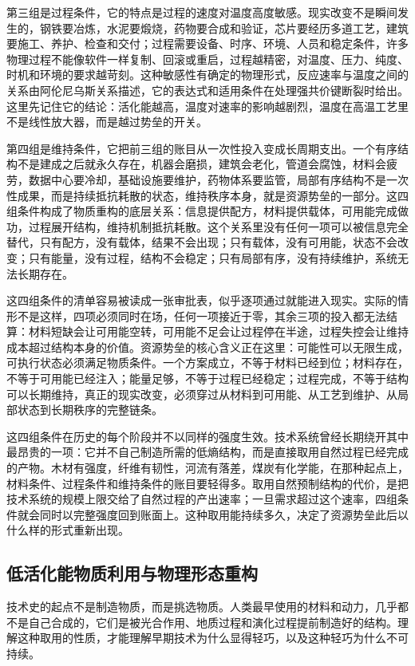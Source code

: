 第三组是过程条件，它的特点是过程的速度对温度高度敏感。现实改变不是瞬间发生的，钢铁要冶炼，水泥要煅烧，药物要合成和验证，芯片要经历多道工艺，建筑要施工、养护、检查和交付；过程需要设备、时序、环境、人员和稳定条件，许多物理过程不能像软件一样复制、回滚或重启，过程越精密，对温度、压力、纯度、时机和环境的要求越苛刻。这种敏感性有确定的物理形式，反应速率与温度之间的关系由阿伦尼乌斯关系描述，它的表达式和适用条件在处理强共价键断裂时给出。这里先记住它的结论：活化能越高，温度对速率的影响越剧烈，温度在高温工艺里不是线性放大器，而是越过势垒的开关。

第四组是维持条件，它把前三组的账目从一次性投入变成长周期支出。一个有序结构不是建成之后就永久存在，机器会磨损，建筑会老化，管道会腐蚀，材料会疲劳，数据中心要冷却，基础设施要维护，药物体系要监管，局部有序结构不是一次性成果，而是持续抵抗耗散的状态，维持秩序本身，就是资源势垒的一部分。这四组条件构成了物质重构的底层关系：信息提供配方，材料提供载体，可用能完成做功，过程展开结构，维持机制抵抗耗散。这个关系里没有任何一项可以被信息完全替代，只有配方，没有载体，结果不会出现；只有载体，没有可用能，状态不会改变；只有能量，没有过程，结构不会稳定；只有局部有序，没有持续维护，系统无法长期存在。

这四组条件的清单容易被读成一张审批表，似乎逐项通过就能进入现实。实际的情形不是这样，四项必须同时在场，任何一项接近于零，其余三项的投入都无法结算：材料短缺会让可用能空转，可用能不足会让过程停在半途，过程失控会让维持成本超过结构本身的价值。资源势垒的核心含义正在这里：可能性可以无限生成，可执行状态必须满足物质条件。一个方案成立，不等于材料已经到位；材料存在，不等于可用能已经注入；能量足够，不等于过程已经稳定；过程完成，不等于结构可以长期维持，真正的现实改变，必须穿过从材料到可用能、从工艺到维护、从局部状态到长期秩序的完整链条。

这四组条件在历史的每个阶段并不以同样的强度生效。技术系统曾经长期绕开其中最昂贵的一项：它并不自己制造所需的低熵结构，而是直接取用自然过程已经完成的产物。木材有强度，纤维有韧性，河流有落差，煤炭有化学能，在那种起点上，材料条件、过程条件和维持条件的账目要轻得多。取用自然预制结构的代价，是把技术系统的规模上限交给了自然过程的产出速率；一旦需求超过这个速率，四组条件就会同时以完整强度回到账面上。这种取用能持续多久，决定了资源势垒此后以什么样的形式重新出现。

\subsection{低活化能物质利用与物理形态重构}

技术史的起点不是制造物质，而是挑选物质。人类最早使用的材料和动力，几乎都不是自己合成的，它们是被光合作用、地质过程和演化过程提前制造好的结构。理解这种取用的性质，才能理解早期技术为什么显得轻巧，以及这种轻巧为什么不可持续。

